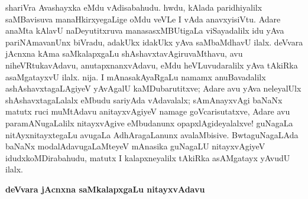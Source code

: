 shariVra Avashayxka eMdu vAdisabahudu. hwdu, kAlada paridhiyalilx saMBavisuva manaHkirxyegaLige oMdu veVLe I vAda anavxyisiVtu. Adare anaMta kAlavU naDeyutitxruva manasasxMBUtigaLa viSayadalilx idu yAva pariNAmavanUnx biVradu, adakUkx idakUkx yAva saMbaMdhavU ilalx. deVvara jAcnxna kAma saMkalapxgaLu shAshavxtavAgiruvaMthavu, avu niheVRtukavAdavu, anutapxnanxvAdavu, eMdu heVLuvudaralilx yAva tAkiRka asaMgatayxvU ilalx. nija. I mAnasakAyaRgaLu namamx anuBavadalilx ashAshavxtagaLAgiyeV yAvAgalU kaMDubarutitxve; Adare avu yAva neleyalUlx shAshavxtagaLalalx eMbudu sariyAda vAdavalalx; sAmAnayxvAgi baNaNx matutx ruci muMtAdavu anitayxvAgiyeV namage goVcarisutatxve, Adare avu paramANugaLalilx nitayxvAgive eMbudanunx opapxlAgideyalalxve! guNagaLa nitAyxnitayxtegaLu avugaLa AdhAragaLanunx avalaMbisive. BwtaguNagaLAda baNaNx modalAdavugaLaMteyeV mAnasika guNagaLU nitayxvAgiyeV idudxkoMDirabahudu, matutx I kalapxneyalilx tAkiRka asAMgatayx yAvudU ilalx.

\smallskip
\begin{center}
{\Large\bf deVvara jAcnxna saMkalapxgaLu nitayxvAdavu}
\end{center}

